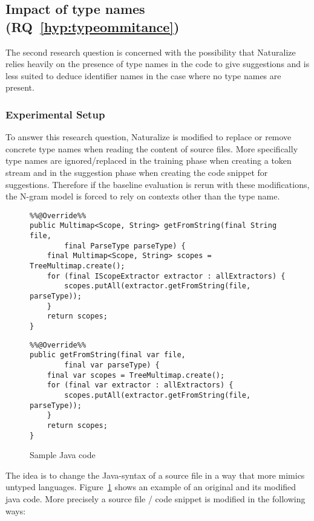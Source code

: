 \subsection{Impact of type names (RQ~\ref{hyp:typeommitance})}
The second research question is concerned with the possibility that Naturalize relies heavily on the presence of type names in the code to give suggestions and is less suited to deduce identifier names in the case where no type names are present.

\subsubsection{Experimental Setup}
To answer this research question, Naturalize is modified to replace or remove concrete type names when reading the content of source files. More specifically type names are ignored/replaced in the training phase when creating a token stream and in the suggestion phase when creating the code snippet for suggestions. Therefore if the baseline evaluation is rerun with these modifications, the N-gram model is forced to rely on contexts other than the type name.

\begin{figure}
    \centering
\begin{lstlisting}
%%@Override%%
public Multimap<Scope, String> getFromString(final String file,
		final ParseType parseType) {
	final Multimap<Scope, String> scopes = TreeMultimap.create();
	for (final IScopeExtractor extractor : allExtractors) {
		scopes.putAll(extractor.getFromString(file, parseType));
	}
	return scopes;
}
\end{lstlisting}%
\begin{lstlisting}
%%@Override%%
public getFromString(final var file,
		final var parseType) {
	final var scopes = TreeMultimap.create();
	for (final var extractor : allExtractors) {
		scopes.putAll(extractor.getFromString(file, parseType));
	}
	return scopes;
}
\end{lstlisting}%
    \caption{Sample Java code}
    \label{fig:meth_javacode}
\end{figure}

The idea is to change the Java-syntax of a source file in a way that more mimics untyped languages. Figure~\ref{fig:meth_javacode} shows an example of an original and its modified java code. More precisely a source file / code snippet is modified in the following ways:

